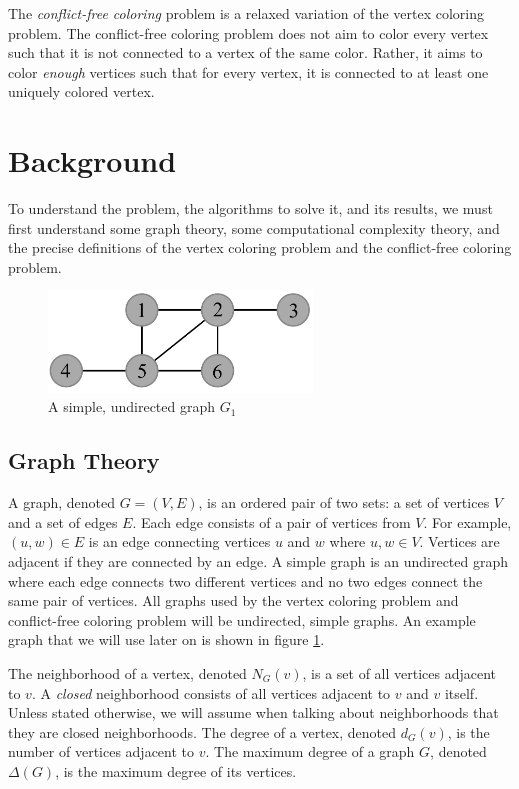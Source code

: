 \documentclass{sig-alternate}
\begin{document}
The \emph{conflict-free coloring} problem is a relaxed variation of the vertex coloring problem. The conflict-free coloring problem does not aim to color every vertex such that it is not connected to a vertex of the same color. Rather, it aims to color \emph{enough} vertices such that for every vertex, it is connected to at least one uniquely colored vertex.


\section{Background}
\label{sec:background}
To understand the problem, the algorithms to solve it, and its results, we must first understand some graph theory, some computational complexity theory, and the precise definitions of the vertex coloring problem and the conflict-free coloring problem.

\begin{figure}[h]
	\centering
	\includegraphics[width=7cm]{../figures/example.pdf}
	\caption{A simple, undirected graph $G_1$}\label{fig:graph}
\end{figure}

\subsection{Graph Theory}
\label{sec:graphtheory}

A graph, denoted $G=(V,E)$, is an ordered pair of two sets: a set of vertices $V$ and a set of edges $E$. Each edge consists of a pair of vertices from $V$. For example, $(u,w) \in E$ is an edge connecting vertices $u$ and $w$ where $u,w \in V$. Vertices are adjacent if they are connected by an edge. A simple graph is an undirected graph where each edge connects two different vertices and no two edges connect the same pair of vertices. All graphs used by the vertex coloring problem and conflict-free coloring problem will be undirected, simple graphs. An example graph that we will use later on is shown in figure \ref{fig:graph}.

The neighborhood of a vertex, denoted $N_G(v)$, is a set of all vertices adjacent to $v$. A \emph{closed} neighborhood consists of all vertices adjacent to $v$ and $v$ itself. Unless stated otherwise, we will assume when talking about neighborhoods that they are closed neighborhoods. The degree of a vertex, denoted $d_G(v)$, is the number of vertices adjacent to $v$. The maximum degree of a graph $G$, denoted $\Delta(G)$, is the maximum degree of its vertices. \cite{bondy1976graph}
\end{document}
